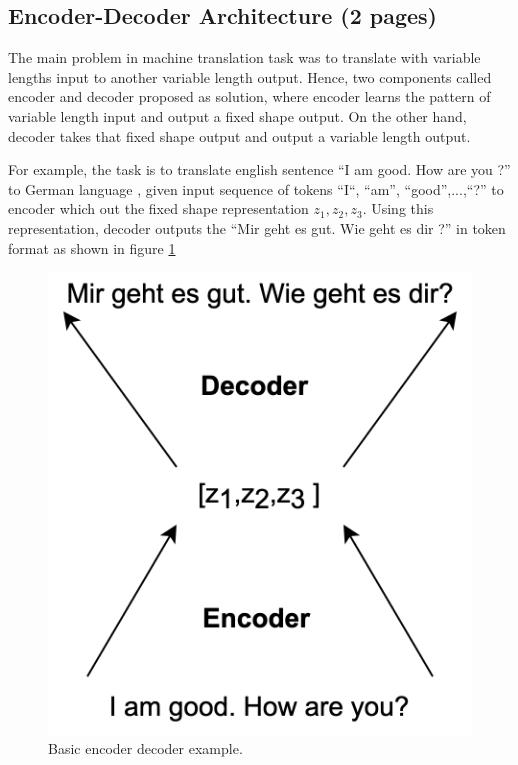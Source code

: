 \documentclass[%
	BCOR=8mm, %
	DIV=12, 
	toc=bibliography, %
	toc=listof, %
	oneside, %
	egregdoesnotlikesansseriftitles, %
	]{scrbook}
\begin{document}
\subsection{Encoder-Decoder Architecture (2 pages)}

The main problem in machine translation task was to translate with variable lengths input to another variable length output. Hence, two components called encoder and decoder proposed as solution, where encoder learns the pattern of variable length input and output a fixed shape output.  On the other hand, decoder takes that fixed shape output and output a variable length output.  

For example, the task is to translate english sentence ``I am good. How are you ?'' to German language , given input sequence of tokens ``I``, ``am'', ``good'',...,``?'' to encoder which out the fixed shape representation $z_{1},z_{2},z_{3}$. Using this representation, decoder outputs the ``Mir geht es gut. Wie geht es dir ?'' in token format as shown in figure \ref{diag:EncoderDecoderExp}


\begin{figure}[h!]
\centering
\includegraphics[width=.30\textwidth]{img/EncoderDecoder2.png}
\caption[Encoder Decoder]{Basic encoder decoder example.}
\label{diag:EncoderDecoderExp}
\end{figure}
\end{document}
